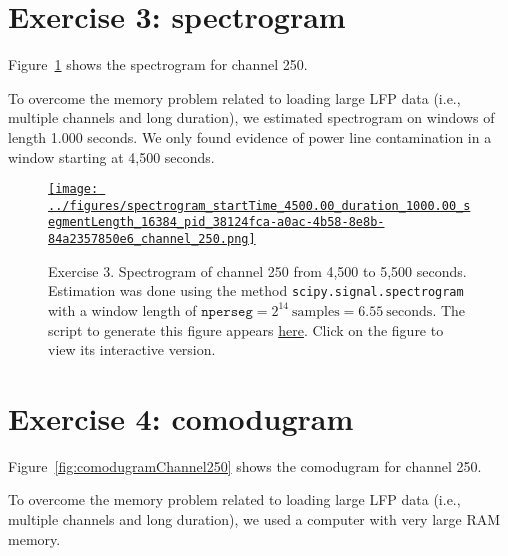 \documentclass[12pt]{article}
\begin{document}
\section*{Exercise 3: spectrogram}

Figure~\ref{fig:spectrogramChannel250} shows the spectrogram for channel 250.

To overcome the memory problem related to loading large LFP data (i.e.,
multiple channels and long duration), we estimated spectrogram on windows of
length 1.000 seconds. We only found evidence of power line contamination in a
window starting at 4,500 seconds.

\begin{figure}[H]
    \begin{center}
        \href{https://www.gatsby.ucl.ac.uk/~rapela/neuroinformatics/2023/ws3/figures/spectrogram_startTime_4500.00_duration_1000.00_segmentLength_16384_pid_38124fca-a0ac-4b58-8e8b-84a2357850e6_channel_250.html}{\texttt{[image: ../figures/spectrogram\_startTime\_4500.00\_duration\_1000.00\_segmentLength\_16384\_pid\_38124fca-a0ac-4b58-8e8b-84a2357850e6\_channel\_250.png]}}



        \caption{Exercise 3. Spectrogram of channel 250 from 4,500 to 5,500
        seconds. Estimation was done
        using the method \texttt{scipy.signal.spectrogram} with a window length
        of $\mathtt{nperseg}=2^14\ \text{samples}=6.55\ \text{seconds}$.
        The script to generate this figure appears
        \href{https://github.com/joacorapela/neuroinformatics23/blob/master/worksheets/ws3/mySolution/code/scripts/doComputeAndPlotSpectrogram.py}{here}.
        Click on the figure to view its interactive version.  }

                \label{fig:spectrogramChannel250}

            \end{center}
        \end{figure}

\section*{Exercise 4: comodugram}

Figure~\ref{fig:comodugramChannel250} shows the comodugram for channel 250.

To overcome the memory problem related to loading large LFP data (i.e.,
multiple channels and long duration), we used a computer with very large RAM memory.
\end{document}
